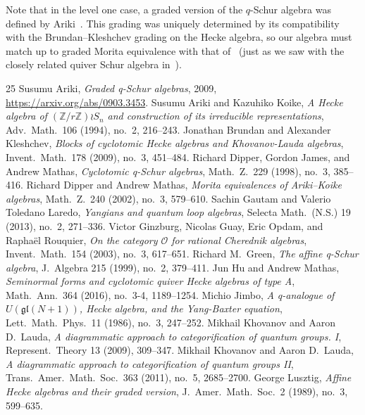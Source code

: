 \documentclass[10pt]{article}
\theoremstyle{definition}
\begin{document}
Note that in the level one case, a graded version of the $q$-Schur
algebra was defined by Ariki~\cite{Arikiq}. This grading was uniquely
determined by its compatibility with the Brundan--Kleshchev grading on
the Hecke algebra, so our algebra must match up to graded Morita
equivalence with that of~\cite[3.17]{Arikiq} (just as we saw with the
closely related quiver Schur algebra in~\cite[Thm.~7.9]{SWschur}).
\clearpage
\printnoidxglossaries
\begin{thebibliography}{25}
 Susumu Ariki, \emph{Graded q-Schur algebras}, 2009, \url{https://arxiv.org/abs/0903.3453}.
 Susumu Ariki and Kazuhiko Koike, \emph{A Hecke algebra of $(\mathbb{Z}/r\mathbb{Z})\wr S_n$ and construction of its irreducible representations}, Adv.\ Math.\ 106 (1994), no.~2, 216--243.
 Jonathan Brundan and Alexander Kleshchev, \emph{Blocks of cyclotomic Hecke algebras and Khovanov-Lauda algebras}, Invent.\ Math.\ 178 (2009), no.~3, 451--484.
 Richard Dipper, Gordon James, and Andrew Mathas, \emph{Cyclotomic q-Schur algebras}, Math.\ Z.\ 229 (1998), no.~3, 385--416.
 Richard Dipper and Andrew Mathas, \emph{Morita equivalences of Ariki--Koike algebras}, Math.\ Z.\ 240 (2002), no.~3, 579--610.
 Sachin Gautam and Valerio Toledano Laredo, \emph{Yangians and quantum loop algebras}, Selecta Math.\ (N.S.) 19 (2013), no.~2, 271--336.
 Victor Ginzburg, Nicolas Guay, Eric Opdam, and Rapha\"el Rouquier, \emph{On the category $\mathcal{O}$ for rational Cherednik algebras}, Invent.\ Math.\ 154 (2003), no.~3, 617--651.
 Richard M.~Green, \emph{The affine q-Schur algebra}, J.\ Algebra 215 (1999), no.~2, 379--411.
 Jun Hu and Andrew Mathas, \emph{Seminormal forms and cyclotomic quiver Hecke algebras of type A}, Math.\ Ann.\ 364 (2016), no.~3-4, 1189--1254.
 Michio Jimbo, \emph{A q-analogue of $U(\mathfrak{gl}(N+1))$, Hecke algebra, and the Yang-Baxter equation}, Lett.\ Math.\ Phys.\ 11 (1986), no.~3, 247--252.
 Mikhail Khovanov and Aaron D.~Lauda, \emph{A diagrammatic approach to categorification of quantum groups. I}, Represent.\ Theory 13 (2009), 309--347.
 Mikhail Khovanov and Aaron D.~Lauda, \emph{A diagrammatic approach to categorification of quantum groups II}, Trans.\ Amer.\ Math.\ Soc.\ 363 (2011), no.~5, 2685--2700.
 George Lusztig, \emph{Affine Hecke algebras and their graded version}, J.\ Amer.\ Math.\ Soc.\ 2 (1989), no.~3, 599--635.

\end{thebibliography}
\end{document}
